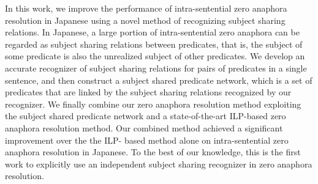 In this work, we improve the performance of intra-sentential zero anaphora resolution in Japanese using a novel method of recognizing subject sharing relations. In Japanese, a large portion of intra-sentential zero anaphora can be regarded as subject sharing relations between predicates, that is, the subject of some predicate is also the unrealized subject of other predicates. We develop an accurate recognizer of subject sharing relations for pairs of predicates in a single sentence, and then construct a subject shared predicate network, which is a set of predicates that are linked by the subject sharing relations recognized by our recognizer. We finally combine our zero anaphora resolution method exploiting the subject shared predicate network and a state-of-the-art ILP-based zero anaphora resolution method. Our combined method achieved a significant improvement over the the ILP- based method alone on intra-sentential zero anaphora resolution in Japanese. To the best of our knowledge, this is the first work to explicitly use an independent subject sharing recognizer in zero anaphora resolution.
